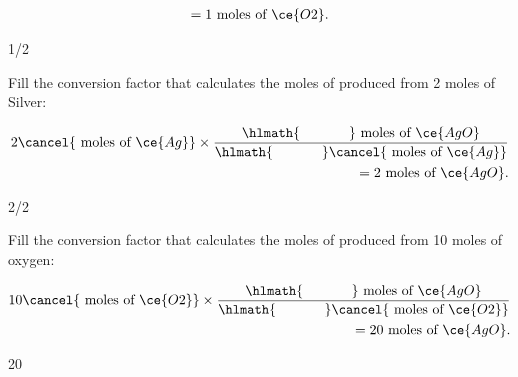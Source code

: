\documentclass[main.tex]{subfiles}
\begin{document}
\begin{multicols*}{2}
\begin{question}[ID=\the\value{numA}]
\begin{equation*}
\begin{split}
=1\text{ moles of }\ce{O2}.
\end{split}\end{equation*}
\end{question}
\begin{solution}
1/2
\hspace{0.1cm}\end{solution}%
\begin{question}[ID=\the\value{numA}]
Fill the conversion factor that calculates the moles of  produced from 2 moles of Silver:
\begin{center}\end{center}
 \begin{equation*}\begin{split}
2\cancel{\text{ moles of }\ce{Ag}} \times \dfrac{\hlmath{\hspace{35pt}}\text{ moles of }\ce{AgO}}{\hlmath{\hspace{35pt}}\cancel{\text{ moles of }\ce{Ag}}}\\
=2\text{ moles of }\ce{AgO}.
\end{split}\end{equation*}
\end{question}
\begin{solution}
2/2
\hspace{0.1cm}\end{solution}%
\begin{question}[ID=\the\value{numA}]
Fill the conversion factor that calculates the moles of  produced from 10 moles of oxygen:
\begin{center}\end{center}
 \begin{equation*}\begin{split}
10\cancel{\text{ moles of }\ce{O2}} \times \dfrac{\hlmath{\hspace{35pt}}\text{ moles of }\ce{AgO}}{\hlmath{\hspace{35pt}}\cancel{\text{ moles of }\ce{O2}}}\\
=20\text{ moles of }\ce{AgO}.
\end{split}\end{equation*}
\end{question}
\begin{solution}
20
\hspace{0.1cm}\end{solution}%

\end{multicols*}
\end{document}
